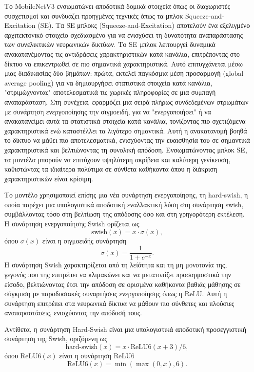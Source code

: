 Το MobileNetV3 ενσωματώνει αποδοτικά δομικά στοιχεία όπως οι διαχωριστές συσχετισμοί και συνδυάζει προηγμένες τεχνικές όπως τα μπλοκ Squeeze-and-Excitation (SE). Τα SE μπλοκς (Squeeze-and-Excitation) αποτελούν ένα εξελιγμένο αρχιτεκτονικό στοιχείο σχεδιασμένο για να ενισχύσει τη δυνατότητα αναπαράστασης των συνελικτικών νευρωνικών δικτύων. Το SE μπλοκ λειτουργεί δυναμικά ανακατανέμοντας τις αντιδράσεις χαρακτηριστικών κατά κανάλια, επιτρέποντας στο δίκτυο να επικεντρωθεί σε πιο σημαντικά χαρακτηριστικά. Αυτό επιτυγχάνεται μέσω μιας διαδικασίας δύο βημάτων: πρώτα, εκτελεί παγκόσμια μέση προσαρμογή (global average pooling) για να δημιουργήσει στατιστικά στοιχεία κατά κανάλια, "στριμώχνοντας" αποτελεσματικά τις χωρικές πληροφορίες σε μια συμπαγή αναπαράσταση. Στη συνέχεια, εφαρμόζει μια σειρά πλήρως συνδεδεμένων στρωμάτων με συνάρτηση ενεργοποίησης την σιγμοειδή, για να "ενεργοποιήσει" ή να ανακατανείμει αυτά τα στατιστικά στοιχεία κατά κανάλια, τονίζοντας πιο σχετιζόμενα χαρακτηριστικά ενώ καταστέλλει τα λιγότερο σημαντικά. Αυτή η ανακατανομή βοηθά το δίκτυο να μάθει πιο αποτελεσματικά, ενισχύοντας την ευαισθησία του σε σημαντικά χαρακτηριστικά και βελτιώνοντας τη συνολική απόδοση. Ενσωματώνοντας μπλοκ SE, τα μοντέλα μπορούν να επιτύχουν υψηλότερη ακρίβεια και καλύτερη γενίκευση, καθιστώντας τα ιδιαίτερα πολύτιμα σε σύνθετα καθήκοντα όπου η διάκριση χαρακτηριστικών είναι κρίσιμη.

Το μοντέλο χρησιμοποιεί επίσης μια νέα συνάρτηση ενεργοποίησης, τη hard-swish, η οποία παρέχει μια υπολογιστικά αποδοτική εναλλακτική λύση στη συνάρτηση swish, συμβάλλοντας τόσο στη βελτίωση της απόδοσης όσο και στη γρηγορότερη εκτέλεση. Η συνάρτηση ενεργοποίησης Swish ορίζεται ως
\[
\text{swish}(x) = x \cdot \sigma(x),
\]
όπου \(\sigma(x)\) είναι η σιγμοειδής συνάρτηση
\[
\sigma(x) = \frac{1}{1 + e^{-x}}.
\]
Η συνάρτηση Swish χαρακτηρίζεται από τη λείότητα και τη μη μονοτονία της, γεγονός που της επιτρέπει να κλιμακώνει και να μετατοπίζει προσαρμοστικά την είσοδο, βελτιώνοντας έτσι την απόδοση σε ορισμένα καθήκοντα βαθιάς μάθησης σε σύγκριση με παραδοσιακές συναρτήσεις ενεργοποίησης όπως η ReLU. Αυτή η συνάρτηση επιτρέπει στα νευρωνικά δίκτυα να μάθουν πιο σύνθετες και πλούσιες αναπαραστάσεις, ενισχύοντας την απόδοσή τους.

Αντίθετα, η συνάρτηση Hard-Swish είναι μια υπολογιστικά αποδοτική προσεγγιστική συνάρτηση της Swish, οριζόμενη ως
\[
\text{hard-swish}(x) = x \cdot \text{ReLU6}(x + 3) / 6,
\]
όπου \(\text{ReLU6}(x)\) είναι η συνάρτηση ReLU6
\[
\text{ReLU6}(x) = \min(\max(0, x), 6).
\]

